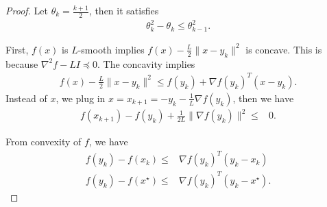 \documentclass{article}
\begin{document}
\begin{proof}
    Let $\theta_k = \frac{k+1}{2}$, then it satisfies
    \begin{align}
        \theta_k^2 - \theta_k \leq \theta_{k-1}^2.
    \end{align}
    
    First, $f(x)$ is $L$-smooth implies $f(x) - \frac{L}{2}\|x-y_k\|^2$ is concave.
    This is because $\nabla^2 f - L I \preceq 0$.
    The concavity implies
    \begin{align}
        f(x) - \frac{L}{2}\|x-y_k\|^2 \leq f(y_k) + \nabla f(y_k)^T (x-y_k).
    \end{align}
    Instead of $x$, we plug in $x = x_{k+1} =- y_k - \frac{1}{L}\nabla f(y_k)$, then we have
    \begin{align}
        f(x_{k+1}) - f(y_k ) + \frac{1}{2L}\|\nabla f(y_k)\|^2\leq& 0. 
    \end{align}
    
    From convexity of $f$, we have
    \begin{align}
        f(y_k) - f(x_k)\leq& \nabla f(y_k)^T (y_k-x_k)\\
        f(y_k) - f(x^\star)\leq& \nabla f(y_k)^T (y_k-x^\star).
    \end{align}


\end{proof}
\end{document}

